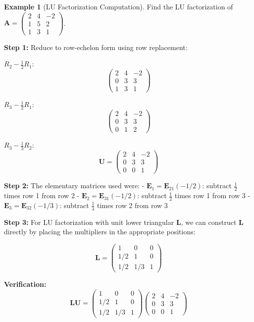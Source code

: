 \documentclass[12pt]{article}
\numberwithin{equation}{section}
\newcommand{\mat}[1]{\mathbf{#1}}        %
\theoremstyle{plain}
\theoremstyle{definition}
\newtheorem{example}[theorem]{Example}
\theoremstyle{remark}
\begin{document}
\begin{example}[LU Factorization Computation]
Find the LU factorization of $\mat{A} = \begin{pmatrix} 2 & 4 & -2 \\ 1 & 5 & 2 \\ 1 & 3 & 1 \end{pmatrix}$.

\textbf{Step 1:} Reduce to row-echelon form using row replacement:

$R_2 - \frac{1}{2}R_1$:
$$\begin{pmatrix} 2 & 4 & -2 \\ 0 & 3 & 3 \\ 1 & 3 & 1 \end{pmatrix}$$

$R_3 - \frac{1}{2}R_1$:
$$\begin{pmatrix} 2 & 4 & -2 \\ 0 & 3 & 3 \\ 0 & 1 & 2 \end{pmatrix}$$

$R_3 - \frac{1}{3}R_2$:
$$\mat{U} = \begin{pmatrix} 2 & 4 & -2 \\ 0 & 3 & 3
\\ 0 & 0 & 1 \end{pmatrix}$$

\textbf{Step 2:} The elementary matrices used were:
- $\mat{E}_1 = \mat{E}_{21}(-1/2)$: subtract $\frac{1}{2}$ times row 1 from row 2
- $\mat{E}_2 = \mat{E}_{31}(-1/2)$: subtract $\frac{1}{2}$ times row 1 from row 3  
- $\mat{E}_3 = \mat{E}_{32}(-1/3)$: subtract $\frac{1}{3}$ times row 2 from row 3

\textbf{Step 3:} For LU factorization with unit lower triangular $\mat{L}$, we can construct $\mat{L}$ directly by placing the multipliers in the appropriate positions:

$$\mat{L} = \begin{pmatrix} 1 & 0 & 0 \\ 1/2 & 1 & 0 \\ 1/2 & 1/3 & 1 \end{pmatrix}$$

\textbf{Verification:}
$$\mat{L}\mat{U} = \begin{pmatrix} 1 & 0 & 0 \\ 1/2 & 1 & 0 \\ 1/2 & 1/3 & 1 \end{pmatrix}\begin{pmatrix} 2 & 4 & -2 \\ 0 & 3 & 3 \\ 0 & 0 & 1 \end{pmatrix}$$


\end{example}
\end{document}
